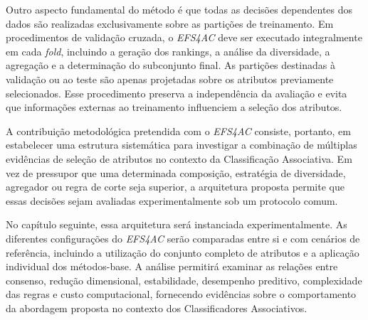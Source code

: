 Outro aspecto fundamental do método é que todas as decisões dependentes dos
dados são realizadas exclusivamente sobre as partições de treinamento. Em
procedimentos de validação cruzada, o \textit{EFS4AC} deve ser executado
integralmente em cada \textit{fold}, incluindo a geração dos rankings, a
análise da diversidade, a agregação e a determinação do subconjunto final.
As partições destinadas à validação ou ao teste são apenas projetadas sobre
os atributos previamente selecionados. Esse procedimento preserva a
independência da avaliação e evita que informações externas ao treinamento
influenciem a seleção dos atributos.

A contribuição metodológica pretendida com o \textit{EFS4AC} consiste,
portanto, em estabelecer uma estrutura sistemática para investigar a
combinação de múltiplas evidências de seleção de atributos no contexto da
Classificação Associativa. Em vez de pressupor que uma determinada composição,
estratégia de diversidade, agregador ou regra de corte seja superior, a
arquitetura proposta permite que essas decisões sejam avaliadas
experimentalmente sob um protocolo comum.

No capítulo seguinte, essa arquitetura será instanciada experimentalmente. As
diferentes configurações do \textit{EFS4AC} serão comparadas entre si e com
cenários de referência, incluindo a utilização do conjunto completo de
atributos e a aplicação individual dos métodos-base. A análise permitirá
examinar as relações entre consenso, redução dimensional, estabilidade,
desempenho preditivo, complexidade das regras e custo computacional,
fornecendo evidências sobre o comportamento da abordagem proposta no contexto
dos Classificadores Associativos.
